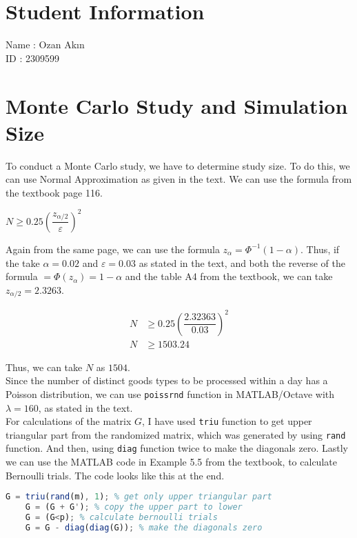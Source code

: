 \documentclass[12pt]{article}
\begin{document}
\section*{Student Information}

Name : Ozan Akın \\

ID : 2309599 \\

\section*{Monte Carlo Study and Simulation Size}

To conduct a Monte Carlo study, we have to determine study size. To do this, we can use Normal Approximation as given in the text. We can use the formula from the textbook page 116.

\begin{center}
    $N \geq 0.25 (\dfrac{z_{\alpha / 2}}{\varepsilon})^2$
\end{center}

Again from the same page, we can use the formula $z_{\alpha} = \Phi^{-1}(1-\alpha)$. Thus, if the take $\alpha = 0.02$ and $\varepsilon = 0.03$ as stated in the text, and both the reverse of the formula $ = \Phi(z_{\alpha}) = 1-\alpha$ and the table A4 from the textbook, we can take $z_{\alpha / 2} = 2.3263$.

\begin{align*}
    N &\geq 0.25 (\dfrac{2.32363}{0.03})^2 \\
    N &\geq 1503.24
\end{align*}

Thus, we can take $N$ as $1504$.
~ \\

Since the number of distinct goods types to be processed within a day has a Poisson distribution, we can use \texttt{poissrnd} function in MATLAB/Octave with $\lambda = 160$, as stated in the text.
~ \\

For calculations of the matrix $G$, I have used \texttt{triu} function to get upper triangular part from the randomized matrix, which was generated by using \texttt{rand} function. And then, using \texttt{diag} function twice to make the diagonals zero. Lastly we can use the MATLAB code in Example 5.5 from the textbook, to calculate Bernoulli trials. The code looks like this at the end. 
~ \\

\begin{lstlisting}[language=Octave]
    G = triu(rand(m), 1); % get only upper triangular part
    G = (G + G'); % copy the upper part to lower
    G = (G<p); % calculate bernoulli trials
    G = G - diag(diag(G)); % make the diagonals zero
\end{lstlisting}
~ \\
\end{document}
